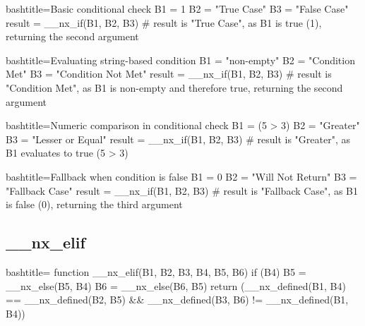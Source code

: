 \begin{NexCodeBox}{bash}{title={Basic conditional check}}
	B1 = 1
	B2 = "True Case"
	B3 = "False Case"
	result = __nx_if(B1, B2, B3)
	# result is "True Case", as B1 is true (1), returning the second argument
\end{NexCodeBox}

\begin{NexCodeBox}{bash}{title={Evaluating string-based condition}}
	B1 = "non-empty"
	B2 = "Condition Met"
	B3 = "Condition Not Met"
	result = __nx_if(B1, B2, B3)
	# result is "Condition Met", as B1 is non-empty and therefore true, returning the second argument
\end{NexCodeBox}

\begin{NexCodeBox}{bash}{title={Numeric comparison in conditional check}}
	B1 = (5 > 3)
	B2 = "Greater"
	B3 = "Lesser or Equal"
	result = __nx_if(B1, B2, B3)
	# result is "Greater", as B1 evaluates to true (5 > 3)
\end{NexCodeBox}


\begin{NexCodeBox}{bash}{title={Fallback when condition is false}}
	B1 = 0
	B2 = "Will Not Return"
	B3 = "Fallback Case"
	result = __nx_if(B1, B2, B3)
	# result is "Fallback Case", as B1 is false (0), returning the third argument
\end{NexCodeBox}

\newpage
\subsection{__nx_elif}
\label{__nx_elif}
\begin{NexCodeBox}{bash}{title={}}
function __nx_elif(B1, B2, B3, B4, B5, B6) {
	if (B4) {
		B5 = __nx_else(B5, B4)
		B6 = __nx_else(B6, B5)
	}
	return (__nx_defined(B1, B4) == __nx_defined(B2, B5) && __nx_defined(B3, B6) != __nx_defined(B1, B4))
}
\end{NexCodeBox}

